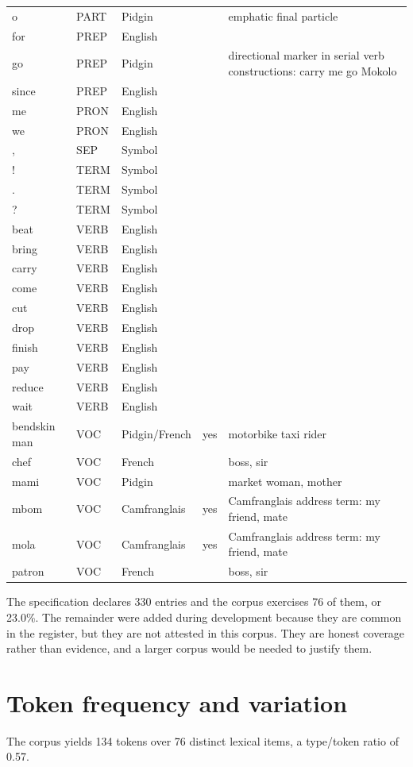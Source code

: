 \documentclass[11pt,a4paper]{article}
\begin{document}
\begin{longtable}{L{0.16} L{0.09} L{0.13} L{0.05} L{0.34}}
o & PART & Pidgin &  & emphatic final particle \\
for & PREP & English &  &  \\
go & PREP & Pidgin &  & directional marker in serial verb constructions: carry me go Mokolo \\
since & PREP & English &  &  \\
me & PRON & English &  &  \\
we & PRON & English &  &  \\
, & SEP & Symbol &  &  \\
! & TERM & Symbol &  &  \\
. & TERM & Symbol &  &  \\
? & TERM & Symbol &  &  \\
beat & VERB & English &  &  \\
bring & VERB & English &  &  \\
carry & VERB & English &  &  \\
come & VERB & English &  &  \\
cut & VERB & English &  &  \\
drop & VERB & English &  &  \\
finish & VERB & English &  &  \\
pay & VERB & English &  &  \\
reduce & VERB & English &  &  \\
wait & VERB & English &  &  \\
bendskin man & VOC & Pidgin/French & yes & motorbike taxi rider \\
chef & VOC & French &  & boss, sir \\
mami & VOC & Pidgin &  & market woman, mother \\
mbom & VOC & Camfranglais & yes & Camfranglais address term: my friend, mate \\
mola & VOC & Camfranglais & yes & Camfranglais address term: my friend, mate \\
patron & VOC & French &  & boss, sir \\
\end{longtable}
\endgroup

The specification declares 330 entries and the corpus exercises 76 of them, or 23.0\%. The remainder were added during development because they are common in the register, but they are not attested in this corpus. They are honest coverage rather than evidence, and a larger corpus would be needed to justify them.

\section{Token frequency and variation}
\label{sec:token-frequency-and-variation}
The corpus yields 134 tokens over 76 distinct lexical items, a type/token ratio of 0.57.
\end{document}
